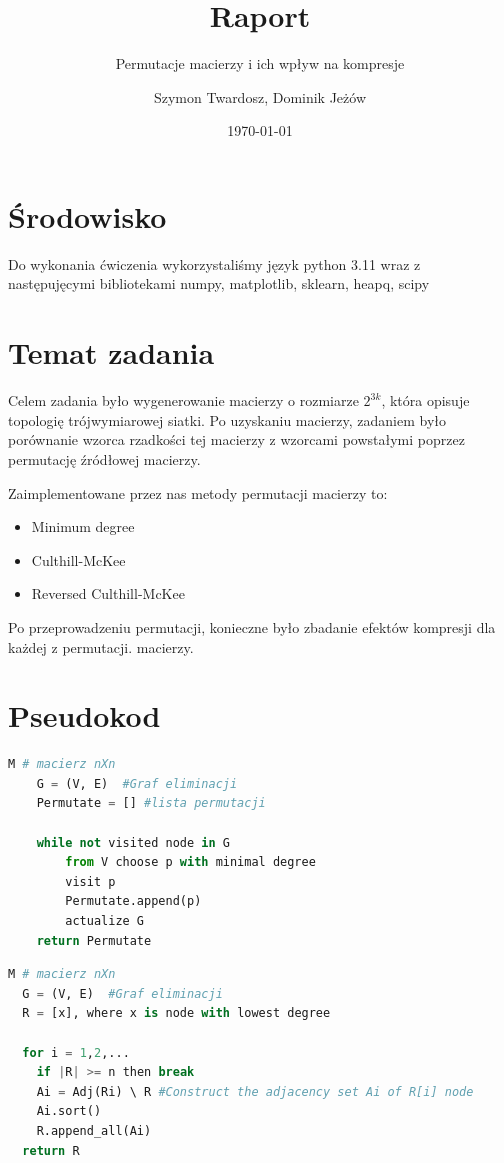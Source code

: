 \documentclass{article}
\title{Raport}
\author{Szymon Twardosz, Dominik Jeżów}
\subtitle{Permutacje macierzy i ich wpływ na kompresje}
\date{\today}
\begin{document}
\maketitle

\section{\'Srodowisko}
Do wykonania \'cwiczenia wykorzystali\'smy język
python 3.11 wraz z nast\k{e}puj\k{e}cymi bibliotekami
numpy, matplotlib, sklearn, heapq, scipy

\section{Temat zadania}

Celem zadania było wygenerowanie macierzy o rozmiarze $2^{3k}$, która opisuje topologię trójwymiarowej siatki. Po uzyskaniu macierzy, zadaniem było porównanie wzorca rzadkości tej macierzy z wzorcami powstałymi poprzez permutację źródłowej macierzy.

\noindent
Zaimplementowane przez nas metody permutacji macierzy to:
\begin{itemize}
\item Minimum degree
\item Culthill-McKee
\item Reversed Culthill-McKee
\end{itemize}

\noindent
Po przeprowadzeniu permutacji, konieczne było zbadanie efektów kompresji dla każdej z permutacji.
 macierzy.
\section{Pseudokod}
\begin{lstlisting}[language=Python, caption={Minimum degree}]
    M # macierz nXn
    G = (V, E)  #Graf eliminacji
    Permutate = [] #lista permutacji

    while not visited node in G
        from V choose p with minimal degree
        visit p
        Permutate.append(p)
        actualize G
    return Permutate
\end{lstlisting}

\begin{lstlisting}[language=Python, caption={Culthill-McKee}]
  M # macierz nXn
  G = (V, E)  #Graf eliminacji
  R = [x], where x is node with lowest degree 
  
  for i = 1,2,...
    if |R| >= n then break
    Ai = Adj(Ri) \ R #Construct the adjacency set Ai of R[i] node
    Ai.sort()
    R.append_all(Ai)
  return R
\end{lstlisting}
\end{document}
